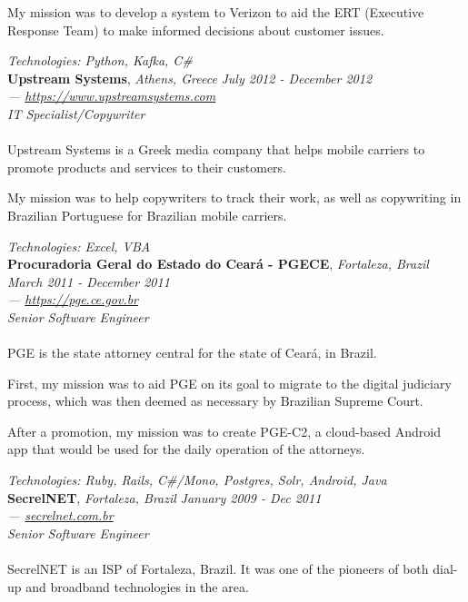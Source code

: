 \documentclass[margin]{res} %
\begin{document}
\begin{resume}
		My mission was to develop a system to Verizon to aid the ERT (Executive Response Team) to make informed decisions about customer issues.

		{\sl Technologies: Python, Kafka, C\#} \\

		{\bf Upstream Systems}, {\sl Athens, Greece} \hfill {\sl July 2012 - December 2012} \\
		{\sl — \href{https://www.upstreamsystems.com}{https://www.upstreamsystems.com}} \\
		{\sl IT Specialist/Copywriter } \\
		\\
		Upstream Systems is a Greek media company that helps mobile carriers to promote products and services to their customers.

		My mission was to help copywriters to track their work, as well as copywriting in Brazilian Portuguese for Brazilian mobile carriers.

		{\sl Technologies: Excel, VBA } \\

		{\bf Procuradoria Geral do Estado do Ceará - PGECE}, {\sl Fortaleza, Brazil} \hfill {\sl March 2011 - December 2011} \\
		{\sl — \href{https://pge.ce.gov.br}{https://pge.ce.gov.br}} \\
		{\sl Senior Software Engineer } \\
		\\
		PGE is the state attorney central for the state of Ceará, in Brazil.

		First, my mission was to aid PGE on its goal to migrate to the digital judiciary process, which was then deemed as necessary by Brazilian Supreme Court.

		After a promotion, my mission was to create PGE-C2, a cloud-based Android app that would be used for the daily operation of the attorneys.

		{\sl Technologies: Ruby, Rails, C\#/Mono, Postgres, Solr, Android, Java } \\

		{\bf SecrelNET}, {\sl Fortaleza, Brazil} \hfill {\sl January 2009 - Dec 2011} \\
		{\sl — \href{https://secrelnet.com.br}{secrelnet.com.br}} \\
		{\sl Senior Software Engineer } \\
		\\
		SecrelNET is an ISP of Fortaleza, Brazil. It was one of the pioneers of both dial-up and broadband technologies in the area.


\end{resume}
\end{document}
